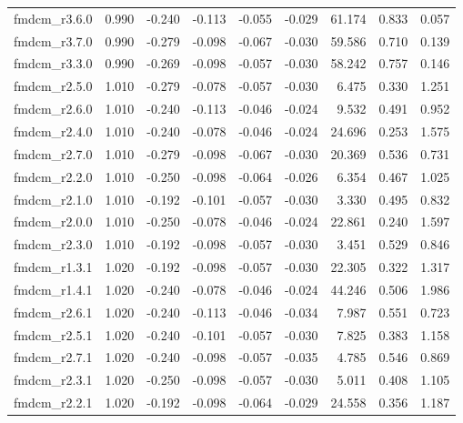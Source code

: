 \begin{longtable}{lrrrrrrrr}
fmdcm\_r3.6.0 &     0.990 &   -0.240 &   -0.113 &  -0.055 &  -0.029 &      61.174 &    0.833 &       0.057 \\
fmdcm\_r3.7.0 &     0.990 &   -0.279 &   -0.098 &  -0.067 &  -0.030 &      59.586 &    0.710 &       0.139 \\
fmdcm\_r3.3.0 &     0.990 &   -0.269 &   -0.098 &  -0.057 &  -0.030 &      58.242 &    0.757 &       0.146 \\
fmdcm\_r2.5.0 &     1.010 &   -0.279 &   -0.078 &  -0.057 &  -0.030 &       6.475 &    0.330 &       1.251 \\
fmdcm\_r2.6.0 &     1.010 &   -0.240 &   -0.113 &  -0.046 &  -0.024 &       9.532 &    0.491 &       0.952 \\
fmdcm\_r2.4.0 &     1.010 &   -0.240 &   -0.078 &  -0.046 &  -0.024 &      24.696 &    0.253 &       1.575 \\
fmdcm\_r2.7.0 &     1.010 &   -0.279 &   -0.098 &  -0.067 &  -0.030 &      20.369 &    0.536 &       0.731 \\
fmdcm\_r2.2.0 &     1.010 &   -0.250 &   -0.098 &  -0.064 &  -0.026 &       6.354 &    0.467 &       1.025 \\
fmdcm\_r2.1.0 &     1.010 &   -0.192 &   -0.101 &  -0.057 &  -0.030 &       3.330 &    0.495 &       0.832 \\
fmdcm\_r2.0.0 &     1.010 &   -0.250 &   -0.078 &  -0.046 &  -0.024 &      22.861 &    0.240 &       1.597 \\
fmdcm\_r2.3.0 &     1.010 &   -0.192 &   -0.098 &  -0.057 &  -0.030 &       3.451 &    0.529 &       0.846 \\
fmdcm\_r1.3.1 &     1.020 &   -0.192 &   -0.098 &  -0.057 &  -0.030 &      22.305 &    0.322 &       1.317 \\
fmdcm\_r1.4.1 &     1.020 &   -0.240 &   -0.078 &  -0.046 &  -0.024 &      44.246 &    0.506 &       1.986 \\
fmdcm\_r2.6.1 &     1.020 &   -0.240 &   -0.113 &  -0.046 &  -0.034 &       7.987 &    0.551 &       0.723 \\
fmdcm\_r2.5.1 &     1.020 &   -0.240 &   -0.101 &  -0.057 &  -0.030 &       7.825 &    0.383 &       1.158 \\
fmdcm\_r2.7.1 &     1.020 &   -0.240 &   -0.098 &  -0.057 &  -0.035 &       4.785 &    0.546 &       0.869 \\
fmdcm\_r2.3.1 &     1.020 &   -0.250 &   -0.098 &  -0.057 &  -0.030 &       5.011 &    0.408 &       1.105 \\
fmdcm\_r2.2.1 &     1.020 &   -0.192 &   -0.098 &  -0.064 &  -0.029 &      24.558 &    0.356 &       1.187 \\

\end{longtable}
